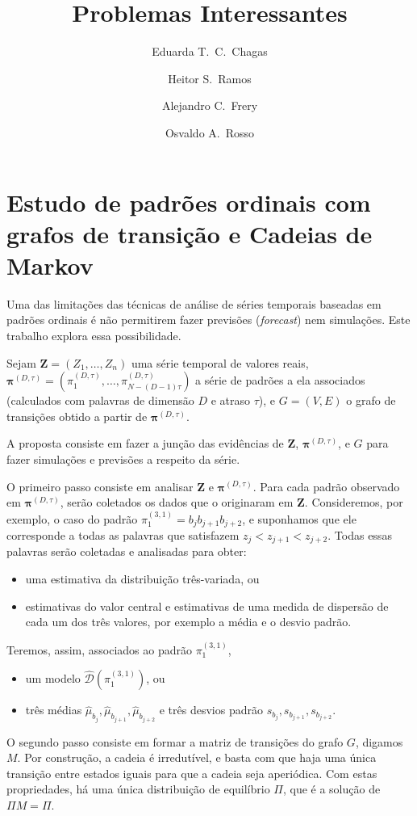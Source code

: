 \documentclass[10pt]{article}
\title{Problemas Interessantes}
\author{
Eduarda T.\ C.\ Chagas\and 
Heitor S.\ Ramos\and 
Alejandro C.\ Frery\and 
Osvaldo A.\ Rosso
}
\begin{document}
\maketitle

\section{Estudo de padrões ordinais com grafos de transição e Cadeias de Markov} \label{abstract}

Uma das limitações das técnicas de análise de séries temporais baseadas em padrões ordinais é não permitirem fazer previsões (\textit{forecast}) nem simulações.
Este trabalho explora essa possibilidade.

Sejam $\bm Z=(Z_1,\dots,Z_n)$ uma série temporal de valores reais,
$\bm \pi^{(D,\tau)} = (\pi^{(D,\tau)}_1,\dots,\pi^{(D,\tau)}_{N-(D-1)\tau})$ a série de padrões a ela associados (calculados com palavras de dimensão $D$ e atraso $\tau$),
e $G=(V,E)$ o grafo de transições obtido a partir de $\bm \pi^{(D,\tau)}$.

A proposta consiste em fazer a junção das evidências de $\bm Z$, $\bm \pi^{(D,\tau)}$, e $G$ para fazer simulações e previsões a respeito da série.

O primeiro passo consiste em analisar $\bm Z$ e $\bm \pi^{(D,\tau)}$.
Para cada padrão observado em $\bm \pi^{(D,\tau)}$, serão coletados os dados que o originaram em $\bm Z$.
Consideremos, por exemplo, o caso do padrão $\pi^{(3,1)}_1=b_{j}b_{j+1}b_{j+2}$, e suponhamos que ele corresponde a todas as palavras que satisfazem $z_{j}<z_{j+1}<z_{j+2}$.
Todas essas palavras serão coletadas e analisadas para obter:
\begin{itemize}
	\item uma estimativa da distribuição três-variada, ou
	\item estimativas do valor central e estimativas de uma medida de dispersão de cada um dos três valores, por exemplo a média e o desvio padrão.
\end{itemize} 
Teremos, assim, associados ao padrão $\pi^{(3,1)}_1$, 
\begin{itemize}
	\item um modelo $\widehat{\mathcal{D}}(\pi^{(3,1)}_1)$, ou
	\item três médias $\widehat\mu_{b_j}, \widehat\mu_{b_{j+1}}, \widehat\mu_{b_{j+2}}$ e três desvios padrão $s_{b_j}, s_{b_{j+1}}, s_{b_{j+2}}$.
\end{itemize} 

O segundo passo consiste em formar a matriz de transições do grafo $G$, digamos $M$.
Por construção, a cadeia é irredutível, e basta com que haja uma única transição entre estados iguais para que a cadeia seja aperiódica.
Com estas propriedades, há uma única distribuição de equilíbrio $\Pi$, que é a solução de $\Pi M=\Pi$.
\end{document}
